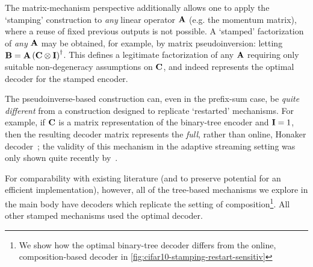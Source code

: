 \documentclass{article} %
\theoremstyle{named}
\begin{document}
The matrix-mechanism perspective additionally allows one to apply the `stamping' construction to \emph{any} linear operator $\mathbf{A}$ (e.g. the momentum matrix), where a reuse of fixed previous outputs is not possible. A `stamped' factorization of \emph{any} $\mathbf{A}$ may be obtained, for example, by matrix pseudoinversion: letting $\mathbf{B} = \mathbf{A}\left(\mathbf{C} \otimes \mathbf{I}\right)^\dagger$. This defines a legitimate factorization of any $\mathbf{A}$ requiring only suitable non-degeneracy assumptions on $\mathbf{C}$, and indeed represents the optimal decoder for the stamped encoder.

The pseudoinverse-based construction can, even in the prefix-sum case, be \emph{quite different} from a construction designed to replicate `restarted' mechanisms. For example, if $\mathbf{C}$ is a matrix representation of the binary-tree encoder and $\mathbf{I} = 1$, then the resulting decoder matrix represents the \emph{full}, rather than online, Honaker decoder~\citep{honaker_trick}; the validity of this mechanism in the adaptive streaming setting was only shown quite recently by~\citet{denisov22matfact}.

For comparability with existing literature (and to preserve potential for an efficient implementation), however, all of the tree-based mechanisms we explore in the main body have decoders which replicate the setting of composition\footnote{We show how the optimal binary-tree decoder differs from the online, composition-based decoder in \cref{fig:cifar10-stamping-restart-sensitiv}}. All other stamped mechanisms used the optimal decoder.



\end{document}
